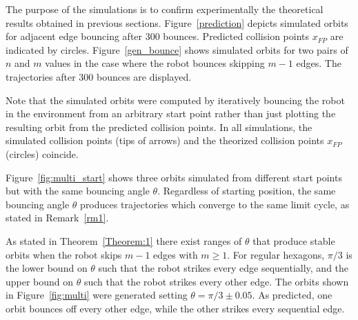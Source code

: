\documentclass[letterpaper, 10 pt, conference]{ieeeconf}  %
\begin{document}
The purpose of the simulations is to confirm experimentally
the theoretical results obtained in previous sections. Figure~\ref{prediction} 
depicts simulated orbits for adjacent edge bouncing after 300 bounces. 
Predicted collision points $x_{FP}$ are indicated by circles. Figure~\ref{gen_bounce}
shows simulated orbits for two pairs of $n$ and $m$ values in the case where the
robot bounces skipping $m-1$ edges. The trajectories after 300 bounces are displayed.

Note that the simulated orbits were computed by iteratively bouncing
the robot in the environment from an arbitrary start point rather than just
plotting the resulting orbit from the predicted collision points.
In all simulations, the simulated collision points (tips of arrows) and the
theorized collision points $x_{FP}$ (circles) coincide.

Figure~\ref{fig:multi_start} shows three orbits simulated from different 
start points but with the same bouncing angle $\theta$. Regardless of starting
position, the same bouncing angle $\theta$ produces trajectories which
converge to the same limit cycle, as stated in 
Remark~\ref{rm1}.


As stated in Theorem~\ref{Theorem:1} there exist ranges of $\theta$ that 
produce stable orbits when the robot skips $m-1$ edges with $m \geq 1$. For
regular hexagons, $\pi/3$ is the lower bound on $\theta$ such that the
robot strikes every edge sequentially, and the upper bound on $\theta$ such that
the robot strikes every other edge.
The orbits shown in Figure~\ref{fig:multi} were generated setting
$\theta = \pi/3 \pm 0.05$. As predicted, one orbit
bounces off every other edge, while the other strikes every sequential edge.
\end{document}
